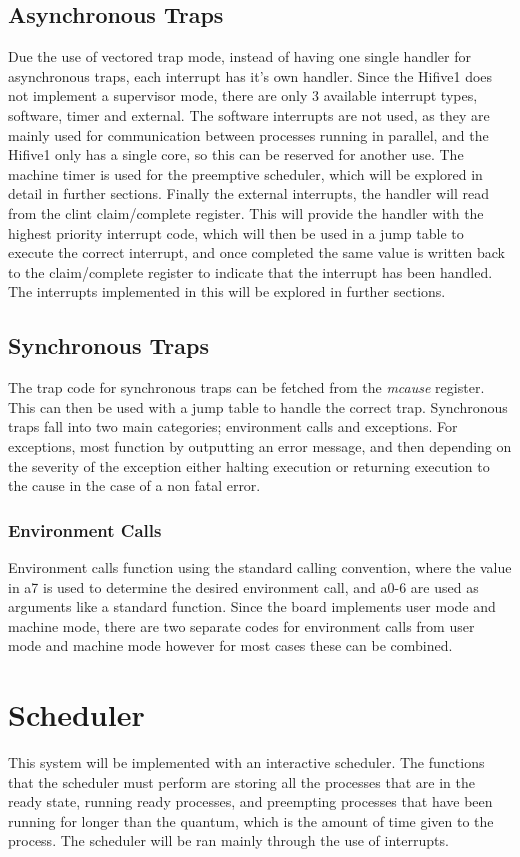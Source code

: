 \subsection{Asynchronous Traps}
Due the use of vectored trap mode, instead of having one single handler for asynchronous traps, each interrupt has it's own handler. Since the Hifive1 does not implement a supervisor mode, there are only 3 available interrupt types, software, timer and external. The software interrupts are not used, as they are mainly used for communication between processes running in parallel, and the Hifive1 only has a single core, so this can be reserved for another use. The machine timer is used for the preemptive scheduler, which will be explored in detail in further sections. Finally the external interrupts, the handler will read from the \ac{clint} claim/complete register. This will provide the handler with the highest priority interrupt code, which will then be used in a jump table to execute the correct interrupt, and once completed the same value is written back to the claim/complete register to indicate that the interrupt has been handled. The interrupts implemented in this will be explored in further sections.
\subsection{Synchronous Traps}
The trap code for synchronous traps can be fetched from the \textit{mcause} register. This can then be used with a jump table to handle the correct trap. Synchronous traps fall into two main categories; environment calls and exceptions. For exceptions, most function by outputting an error message, and then depending on the severity of the exception either halting execution or returning execution to the cause in the case of a non fatal error.
\subsubsection{Environment Calls}
Environment calls function using the standard calling convention, where the value in a7 is used to determine the desired environment call, and a0-6 are used as arguments like a standard function. Since the board implements user mode and machine mode, there are two separate codes for environment calls from user mode and machine mode however for most cases these can be combined.
\section{Scheduler}
This system will be implemented with an interactive scheduler. The functions that the scheduler must perform are storing all the processes that are in the ready state, running ready processes, and preempting processes that have been running for longer than the quantum, which is the amount of time given to the process. The scheduler will be ran mainly through the use of interrupts.
